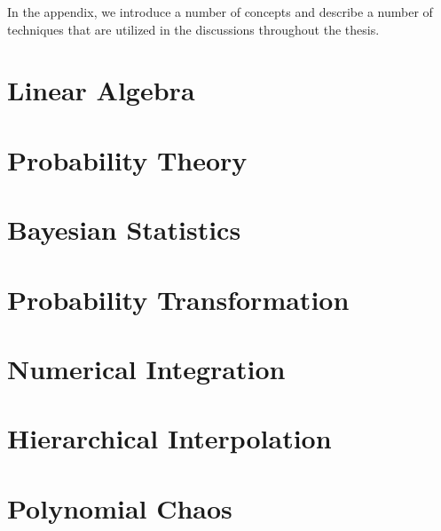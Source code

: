 In the appendix, we introduce a number of concepts and describe a number of
techniques that are utilized in the discussions throughout the thesis.

\section{Linear Algebra}

\section{Probability Theory}

\section{Bayesian Statistics}

\section{Probability Transformation}

\section{Numerical Integration}

\section{Hierarchical Interpolation}

\section{Polynomial Chaos}
